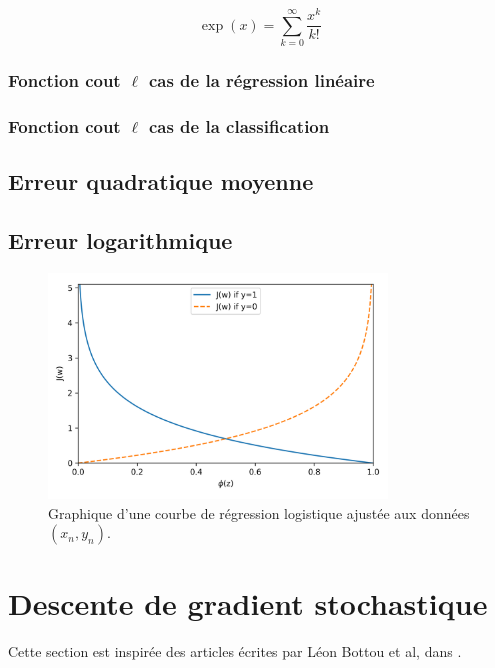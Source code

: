 	\[\exp(x)=\sum_{k=0}^{\infty}\frac{x^k}{k!}\]
	\lipsum[4]
	\subsubsection{Fonction cout $\ell$ cas de la régression linéaire}
	\lipsum[1]
	\subsubsection{Fonction cout $\ell$ cas  de la classification}
	\lipsum[1]
	
	\subsection{Erreur quadratique moyenne }
	\lipsum[1] %
	\subsection{Erreur logarithmique}
	\lipsum[1]
	\begin{figure}[hth]%
		\centering
		\includegraphics[width=9cm]{images/minimum_log_curve.png}
		\caption{Graphique d'une courbe de régression logistique ajustée aux données $(x_n , y_n)$. \cite{ml2008python}}
		\label{fig:minimum_log_curve}
	\end{figure}
	
	
	
	
	\section{Descente de gradient stochastique}
	Cette section est inspirée des articles écrites par Léon Bottou et al, dans  \cite{bottou2012stochastic} 
	\cite{bottou2010large}
	\cite{framling2004scaled}
	\cite{bottou2018optimization}
	\cite{netrapalli2019stochastic}
	\cite{wijnhoven2010fast}.
	
